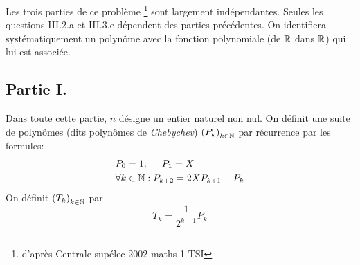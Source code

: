 Les trois parties de ce problème \footnote{d'après Centrale supélec 2002 maths 1 TSI} sont largement indépendantes. Seules les questions III.2.a  et III.3.e dépendent des parties précédentes. On identifiera systématiquement un polynôme avec la fonction polynomiale (de $\mathbb{R}$ dans $\mathbb{R}$) qui lui est associée. 
\subsection*{Partie I.}
Dans toute cette partie, $n$ désigne un entier naturel non nul. On définit une suite de polynômes (dits polynômes de \emph{Chebychev}) $\left(P_k \right)_{k\in\mathbb{N}}$ par récurrence par les formules:
\begin{align*}
& P_0 =1, \hspace{0.5cm} P_1 = X \\
&\forall k \in \mathbb{N} : P_{k+2} = 2XP_{k+1}-P_k 
\end{align*}
On définit $\left(T_k \right)_{k\in\mathbb{N}}$ par 
\begin{displaymath}
 T_k=\frac{1}{2^{k-1}}P_k
\end{displaymath}
